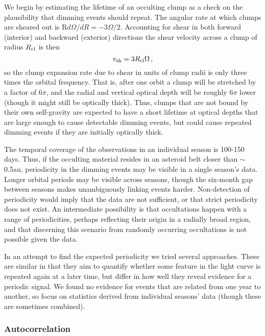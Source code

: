 \documentclass[]{rsos}
\begin{document}
We begin by estimating the lifetime of an occulting clump as a check on the plausibility
that dimming events should repeat. The angular rate at which clumps are sheared
  out is R$d \Omega / dR = - 3 \Omega / 2$. Accounting for shear in both forward
  (interior) and backward (exterior) directions the shear velocity across a clump of
  radius $R_{\rm cl}$ is then
\begin{equation}\label{eq:shear}
  v_{\rm sh} = 3 R_{\rm cl} \Omega \, ,
\end{equation}
so the clump expansion rate due to shear in units of clump radii is only three times the
orbital frequency. That is, after one orbit a clump will be stretched by a factor of
$6\pi$, and the radial and vertical optical depth will be roughly $6\pi$ lower (though it
might still be optically thick). Thus, clumps that are not bound by their own
self-gravity are expected to have a short lifetime at optical depths that are large
enough to cause detectable dimming events, but could cause repeated dimming events if
they are initially optically thick.

The temporal coverage of the observations in an individual season is 100-150 days. Thus,
if the occulting material resides in an asteroid belt closer than $\sim$0.5au,
periodicity in the dimming events may be visible in a single season's data. Longer
orbital periods may be visible across seasons, though the six-month gap between seasons
makes unambiguously linking events harder. Non-detection of periodicity would imply that
the data are not sufficient, or that strict periodicity does not exist. An intermediate
possibility is that occultations happen with a range of periodicities, perhaps reflecting
their origin in a radially broad region, and that discerning this scenario from randomly
occurring occultations is not possible given the data.

In an attempt to find the expected periodicity we tried several approaches. These are
similar in that they aim to quantify whether some feature in the light curve is repeated
again at a later time, but differ in how well they reveal evidence for a periodic
signal. We found no evidence for events that are related from one year to another, so
focus on statistics derived from individual seasons' data (though these are sometimes
combined).

\subsubsection{Autocorrelation}\label{sss:auto}
\end{document}
